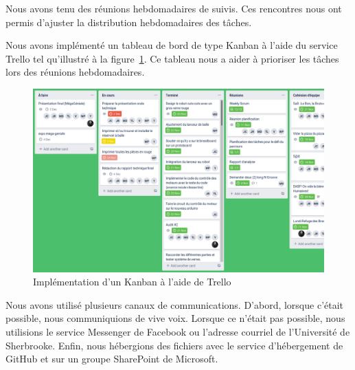 Nous avons tenu des réunions hebdomadaires de suivis.
Ces rencontres nous ont permis d'ajuster la distribution hebdomadaires des tâches.

Nous avons implémenté un tableau de bord de type Kanban à l'aide du service Trello tel qu'illustré à la figure~\ref{fig:planif-trello}.
Ce tableau nous a aider à prioriser les tâches lors des réunions hebdomadaires.

\begin{figure}[h!]
    \centering
    \includegraphics[width=\linewidth]{img/s1/trello}
    \caption{Implémentation d'un Kanban à l'aide de Trello}
    \label{fig:planif-trello}
\end{figure}

Nous avons utilisé plusieurs canaux de communications.
D'abord, lorsque c'était possible, nous communiquions de vive voix.
Lorsque ce n'était pas possible, nous utilisions le service Messenger de Facebook ou l'adresse courriel de l’Université de Sherbrooke.
Enfin, nous hébergions des fichiers avec le service d'hébergement de GitHub et sur un groupe SharePoint de Microsoft.
